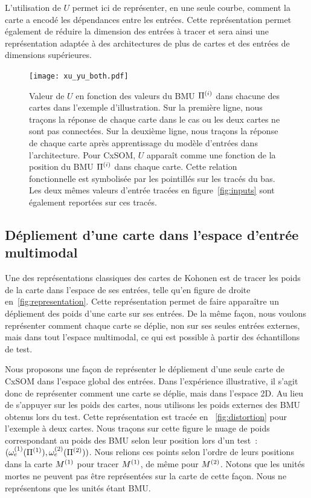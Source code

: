 \documentclass[../main]{subfiles}
\begin{document}
L'utilisation de $U$ permet ici de représenter, en une seule courbe, comment la carte a encodé les dépendances entre les entrées.
Cette représentation permet également de réduire la dimension des entrées à tracer et sera ainsi une représentation adaptée à des architectures de plus de cartes et des entrées de dimensions supérieures.

\begin{figure}
\centering
\texttt{[image: xu\_yu\_both.pdf]}
\caption{Valeur de $U$ en fonction des valeurs du BMU $\Pi^{({i})}$ dans chacune des cartes dans l'exemple d'illustration. Sur la première ligne, nous traçons la réponse de chaque carte dans le cas ou les deux cartes ne sont pas connectées. Sur la deuxième ligne, nous traçons la réponse de chaque carte après apprentissage du modèle d'entrées dans l'architecture.
Pour CxSOM, $U$ apparaît comme une fonction de la position du BMU $\Pi^{({i})}$ dans chaque carte. Cette relation fonctionnelle est symbolisée par les pointillés sur les tracés du bas.
Les deux mêmes valeurs d'entrée tracées en figure~\ref{fig:inputs} sont également reportées sur ces tracés.
\label{fig:piu}}
\end{figure}

\subsection{Dépliement d'une carte dans l'espace d'entrée multimodal}

Une des représentations classiques des cartes de Kohonen est de tracer les poids de la carte dans l'espace de ses entrées, telle qu'en figure de droite en~\ref{fig:representation}. Cette représentation permet de faire apparaître un dépliement des poids d'une carte sur ses entrées.
De la même façon, nous voulons représenter comment chaque carte se déplie, non sur ses seules entrées externes, mais dans tout l'espace multimodal, ce qui est possible à partir des échantillons de test.

Nous proposons une façon de représenter le dépliement d'une seule carte de CxSOM dans l'espace global des entrées. Dans l'expérience illustrative, il s'agit donc de représenter comment une carte se déplie, mais dans l'espace 2D.
Au lieu de s'appuyer sur les poids des cartes, nous utilisons les poids externes des BMU obtenus lors du test. Cette représentation est tracée en ~\ref{fig:distortion} pour l'exemple à deux cartes.
Nous traçons sur cette figure le nuage de poids correspondant au poids des BMU selon leur position lors d'un test~: $ (\omega_e^{({1})}(\Pi^{({1})}),\omega_e^{({2})}(\Pi^{({2})}))$. 
Nous relions ces points selon l'ordre de leurs positions dans la carte $M^{({1})}$ pour tracer $M^{({1})}$, de même pour $M^{({2})}$.  
Notons que les unités mortes ne peuvent pas être représentées sur la carte de cette façon. Nous ne représentons que les unités étant BMU. 
\end{document}
